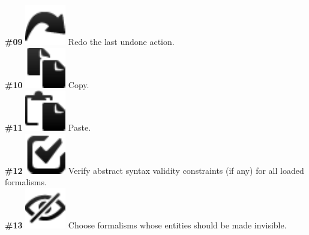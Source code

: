 \documentclass{article}
\numberwithin{equation}{section}
\numberwithin{figure}{section}
\begin{document}
\textbf{\#09} \hspace*{1cm}
\includegraphics[scale=0.5]{figures/icon_redo} \hspace*{1cm}
Redo the last undone action.\\

\textbf{\#10} \hspace*{1cm}
\includegraphics[scale=0.5]{figures/icon_copy} \hspace*{1cm}
Copy.\\

\textbf{\#11} \hspace*{1cm}
\includegraphics[scale=0.5]{figures/icon_paste} \hspace*{1cm}
Paste.\\

\textbf{\#12} \hspace*{1cm}
\includegraphics[scale=0.5]{figures/icon_validateM} \hspace*{1cm}
Verify abstract syntax validity constraints (if any) for all loaded formalisms.\\

\textbf{\#13} \hspace*{1cm}
\includegraphics[scale=0.5]{figures/icon_togglemm} \hspace*{1cm}
Choose formalisms whose entities should be made invisible.\\
\end{document}
